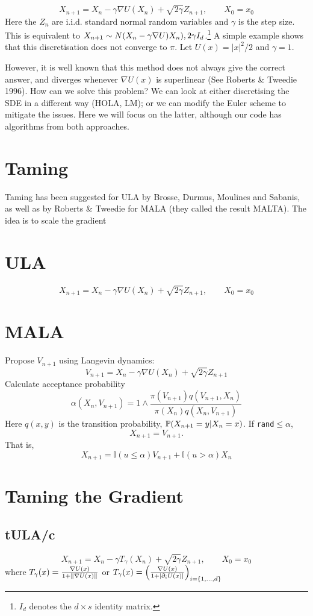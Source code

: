 \[X_{n+1} = X_n -\gamma \nabla U(X_n) +\sqrt{2\gamma} Z_{n+1},\qquad X_0= x_0 \]
Here the \(Z_n \) are i.i.d. standard normal random variables and \(\gamma\) is the step size. This is equivalent to \(X_{n+1} \sim N(X_n - \gamma\grad U)X_n), 2\gamma I_d \).\footnote{\(I_d\) denotes the \(d \times s\) identity matrix.} A simple example shows that this discretisation does not converge to \(\pi\). Let \(U(x) = |x|^2/2 \) and \(\gamma = 1\). 






However, it is well known that this method does not always give the correct answer, and diverges whenever \(\nabla U(x)\) is superlinear (See Roberts \& Tweedie 1996). How can we solve this problem? We can look at either discretising the SDE in a different way (HOLA, LM); or we can modify the Euler scheme to mitigate the issues. Here we will focus on the latter, although our code has algorithms from both approaches. 

\section{Taming}
Taming has been suggested for ULA by Brosse, Durmus, Moulines and Sabanis, as well as by Roberts \& Tweedie for MALA (they called the result MALTA). The idea is to scale the gradient 

\section{ULA}
\[X_{n+1} = X_n -\gamma \nabla U(X_n) +\sqrt{2\gamma} Z_{n+1},\qquad X_0= x_0 \]
\section{MALA}
\cite{RT_MALA}
Propose \(V_{n+1}\) using Langevin dynamics:
\[V_{n+1} = X_n -\gamma \nabla U(X_n) +\sqrt{2\gamma} Z_{n+1}\]
Calculate acceptance probability
\[\alpha(X_n,V_{n+1}) = 1\wedge \frac{\pi(V_{n+1})q(V_{n+1},X_n)}{\pi(X_n)q(X_n,V_{n+1})}\]
Here \(q(x,y)\) is the transition probability, \(\P(X_{n+1}=y | X_{n}=x)\). If \texttt{rand}\(\leq\alpha\), 
\[X_{n+1} = V_{n+1}.\]
That is,
\[X_{n+1} = \mathbb{I}(u\leq \alpha)V_{n+1} +\mathbb{I}(u > \alpha)X_n \]

\section{Taming the Gradient}
\subsection{tULA/c}
\[X_{n+1} = X_n -\gamma T_{\gamma}(X_n) +\sqrt{2\gamma} Z_{n+1},\qquad X_0= x_0 \]
where \(T_{\gamma}(x) = \frac{\grad U(x)}{1+\|\grad U(x)\|}\) or \(T_{\gamma}(x) =\left(\frac{\grad U(x)}{1+|\partial_i U(x)|}\right)_{i=\lbrace 1, \dots, d\rbrace} \)
